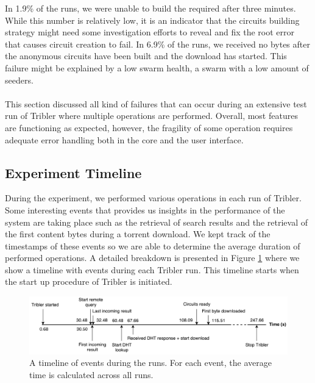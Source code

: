 In 1.9\% of the runs, we were unable to build the required after three minutes. While this number is relatively low, it is an indicator that the circuits building strategy might need some investigation efforts to reveal and fix the root error that causes circuit creation to fail. In 6.9\% of the runs, we received no bytes after the anonymous circuits have been built and the download has started. This failure might be explained by a low swarm health, a swarm with a low amount of seeders.\\\\
This section discussed all kind of failures that can occur during an extensive test run of Tribler where multiple operations are performed. Overall, most features are functioning as expected, however, the fragility of some operation requires adequate error handling both in the core and the user interface.

\subsection{Experiment Timeline}
During the experiment, we performed various operations in each run of Tribler. Some interesting events that provides us insights in the performance of the system are taking place such as the retrieval of search results and the retrieval of the first content bytes during a torrent download. We kept track of the timestamps of these events so we are able to determine the average duration of performed operations. A detailed breakdown is presented in Figure \ref{fig:big-experiment-breakdown} where we show a timeline with events during each Tribler run. This timeline starts when the start up procedure of Tribler is initiated.

\begin{figure}[!h]
	\centering
	\includegraphics[width=1.0\columnwidth]{images/big_experiment/big_experiment_breakdown}
	\caption{A timeline of events during the runs. For each event, the average time is calculated across all runs.}
	\label{fig:big-experiment-breakdown}
\end{figure}

